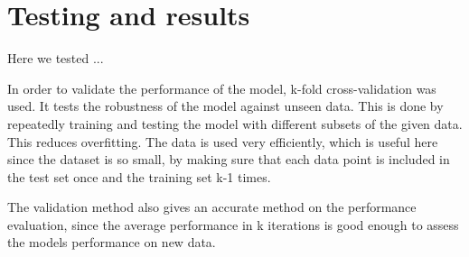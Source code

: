 % 
% 
% 
\section{Testing and results \label{ch:T_R}}
\vspace{0.5cm}

Here we tested ... 

In order to validate the performance of the model, k-fold cross-validation was used. It tests the robustness of the model against unseen data. This is done by repeatedly training and testing the model with different subsets of the given data. This reduces overfitting. The data is used very efficiently, which is useful here since the dataset is so small, by making sure that each data point is included in the test set once and the training set k-1 times. 

The validation method also gives an accurate method on the performance evaluation, since the average performance in k iterations is good enough to assess the models performance on new data. 


% 
% 

